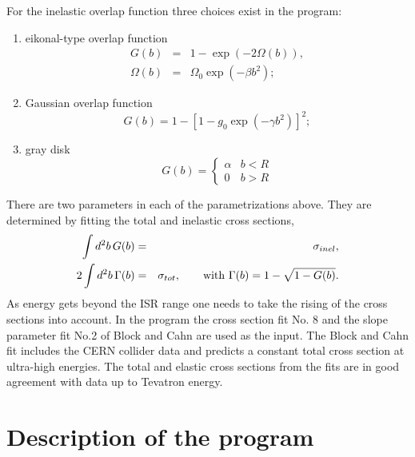 For the inelastic overlap function three choices exist in the program:  
\begin{enumerate}
\item eikonal-type overlap function
\begin{eqnarray}
\label{geikon}
G(b) &=& 1 - \exp(-2\Omega(b)), \nonumber \\
\Omega(b) &=& \Omega_0 \exp( - \beta b^2);
\end{eqnarray}
\item Gaussian overlap function
\begin{equation}
\label{ggaus}
G(b) = 1 - \left[1-g_0\exp(-\gamma b^2)\right]^2; 
\end{equation}
\item gray disk 
\begin{equation}
\label{gdisk}
 G(b) = \left\{ \begin{array}{ll}
              \alpha & \mbox{$b<R$} \\
                0    & \mbox{$b>R$}
              \end{array} \right. 
\end{equation}
\end{enumerate}
There are two parameters in each of the parametrizations above.  They
are determined by fitting the total and inelastic cross sections,
\begin{eqnarray}
\label{totel}
\int d^2b\,G(b) &=& \sigma_{inel}, \nonumber \\
2\int d^2b\,\Gamma(b) &=& \sigma_{tot},\qquad  
 {\rm with\ } \Gamma(b) = 1-\sqrt{1-G(b)}. 
\end{eqnarray}
As energy gets beyond the ISR range one needs to take the rising of
the cross sections into account.  In the program the cross section fit No. 8 
and the slope parameter fit No.2 of Block and Cahn \cite{block}  
are used as the input.
The Block and Cahn fit includes the CERN collider data and predicts
a constant total cross section at ultra-high energies.  The total and
elastic cross sections from the fits are in good agreement with data
up to Tevatron energy.    

\section{Description of the program}

